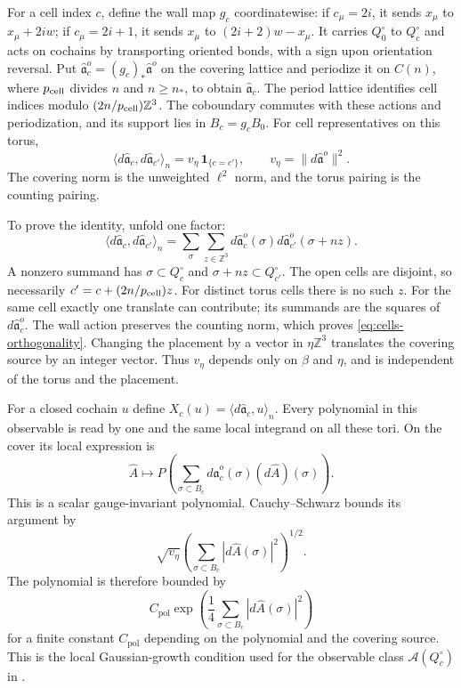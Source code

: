 \documentclass[11pt,letterpaper,reqno]{amsart}
\newcommand{\Z}{\mathbb Z}
\begin{document}
For a cell index $c$, define the wall map $g_c$ coordinatewise:
if $c_\mu=2i$, it sends $x_\mu$ to $x_\mu+2iw$; if
$c_\mu=2i+1$, it sends $x_\mu$ to $(2i+2)w-x_\mu$.
It carries $Q_0^\circ$ to $Q_c^\circ$ and acts on cochains by
transporting oriented bonds, with a sign upon orientation reversal. Put
$\hat{\mathfrak a}_c^o=(g_c)_*\hat{\mathfrak a}^o$ on the
covering lattice and periodize it on $C(n)$, where $p_{\rm cell}$ divides
$n$ and $n\ge n_*$, to obtain $\hat{\mathfrak a}_c$.
The period lattice identifies cell indices modulo
$(2n/p_{\rm cell})\Z^3$. The coboundary commutes with these actions
and periodization, and its support lies in $B_c=g_cB_0$.
For cell representatives on this torus,
\begin{equation}\label{eq:cells-orthogonality}
 \langle d\hat{\mathfrak a}_c,d\hat{\mathfrak a}_{c'}\rangle_n
             =v_\eta\,\mathbf1_{\{c=c'\}},\qquad
 v_\eta=\|d\hat{\mathfrak a}^o\|^2.
\end{equation}
The covering norm is the unweighted $\ell^2$ norm, and the
torus pairing is the counting pairing.

To prove the identity, unfold one factor:
\[
 \langle d\hat{\mathfrak a}_c,d\hat{\mathfrak a}_{c'}\rangle_n
  =\sum_{\sigma}\sum_{z\in\Z^3}
       d\hat{\mathfrak a}_c^o(\sigma)
       d\hat{\mathfrak a}_{c'}^o(\sigma+nz).
\]
A nonzero summand has $\sigma\subset Q_c^\circ$ and
$\sigma+nz\subset Q_{c'}^\circ$. The open cells are disjoint,
so necessarily $c'=c+(2n/p_{\rm cell})z$. For distinct torus cells
there is no such $z$. For the same cell exactly one translate
can contribute; its summands are the squares of
$d\hat{\mathfrak a}_c^o$. The wall action preserves the
counting norm, which proves \eqref{eq:cells-orthogonality}.
Changing the placement by a vector in $\eta\Z^3$ translates
the covering source by an integer vector. Thus $v_\eta$
depends only on $\beta$ and $\eta$, and is independent of
the torus and the placement.

For a closed cochain $u$ define
$X_c(u)=\langle d\hat{\mathfrak a}_c,u\rangle_n$.
Every polynomial in this observable is read by one and the
same local integrand on all these tori. On the cover its
local expression is
\[
 \widehat A\longmapsto
 P\left(\sum_{\sigma\subset B_c}
             d\hat{\mathfrak a}_c^o(\sigma)(d\widehat A)(\sigma)\right).
\]
This is a scalar gauge-invariant polynomial. Cauchy--Schwarz
bounds its argument by
\[
 \sqrt{v_\eta}\left(\sum_{\sigma\subset B_c}
                      |d\widehat A(\sigma)|^2\right)^{1/2}.
\]
The polynomial is therefore bounded by
\[
 C_{\mathrm{pol}}\exp\left(\frac14\sum_{\sigma\subset B_c}
                                      |d\widehat A(\sigma)|^2\right)
\]
for a finite constant $C_{\mathrm{pol}}$ depending on the polynomial
and the covering source. This is the local Gaussian-growth condition used for the
observable class $\mathcal A(Q_c^\circ)$ in \cite[\S4.1, (46)]{ChamberLattice}.
\end{document}
